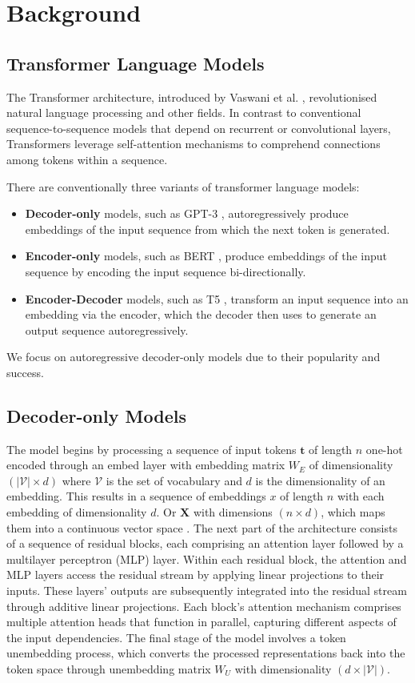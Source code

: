 \chapter{Background}
\section{Transformer Language Models}

The Transformer architecture, introduced by Vaswani et al. \cite{vaswani_attention_2017}, revolutionised natural language processing and other fields. In contrast to conventional sequence-to-sequence models that depend on recurrent or convolutional layers, Transformers leverage self-attention mechanisms to comprehend connections among tokens within a sequence. 

There are conventionally three variants of transformer language models:
\begin{itemize}
    \item \textbf{Decoder-only} models, such as GPT-3 \cite{brown_language_2020}, autoregressively produce embeddings of the input sequence from which the next token is generated.
    \item \textbf{Encoder-only} models, such as BERT \cite{devlin_bert_2019}, produce embeddings of the input sequence by encoding the input sequence bi-directionally.
    \item \textbf{Encoder-Decoder} models, such as T5 \cite{raffel_exploring_2020}, transform an input sequence into an embedding via the encoder, which the decoder then uses to generate an output sequence autoregressively.
\end{itemize}

We focus on autoregressive decoder-only models due to their popularity and success.

\section{Decoder-only Models}
The model begins by processing a sequence of input tokens $\bm{t}$ of length $n$ one-hot encoded through an embed layer with embedding matrix $W_E$ of dimensionality $({|\mathcal{V}|\times d})$ where $\mathcal{V}$ is the set of vocabulary and $d$ is the dimensionality of an embedding. This results in a sequence of embeddings $x$ of length $n$ with each embedding of dimensionality $d$. Or $\bm{X}$ with dimensions $({n \times d})$, which maps them into a continuous vector space \cite{ferrando_primer_2024}. The next part of the architecture consists of a sequence of residual blocks, each comprising an attention layer followed by a multilayer perceptron (MLP) layer. Within each residual block, the attention and MLP layers access the residual stream by applying linear projections to their inputs. These layers' outputs are subsequently integrated into the residual stream through additive linear projections. Each block's attention mechanism comprises multiple attention heads that function in parallel, capturing different aspects of the input dependencies. The final stage of the model involves a token unembedding process, which converts the processed representations back into the token space through unembedding matrix $W_U$ with dimensionality $({d \times |\mathcal{V}|})$.


